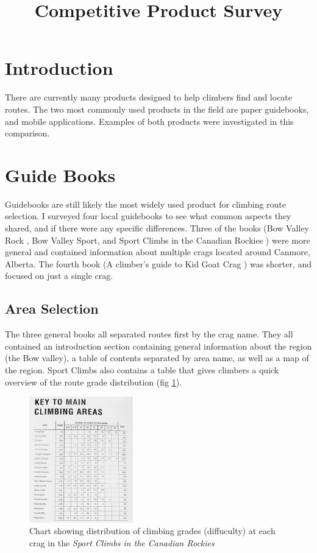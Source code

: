 \documentclass[10pt]{article}
\title{\color{cadet}Competitive Product Survey}
\author{}
\date{}
\begin{document}
\maketitle
\section{Introduction}
There are currently many products designed to help climbers find and locate routes. The two most commonly used products in the field are paper guidebooks, and mobile applications. Examples of both products were investigated in this comparison.

\section{Guide Books}
Guidebooks are still likely the most widely used product for climbing route selection. I surveyed four local guidebooks to see what common aspects they shared, and if there were any specific differences. Three of the books (Bow Valley Rock \cite{galloway}, Bow Valley Sport\cite{martin}, and Sport Climbs in the Canadian Rockies \cite{perry}) were more general and contained information about multiple crags located around Canmore, Alberta. The fourth book (A climber’s guide to Kid Goat Crag \cite{yonge}) was shorter, and focused on just a single crag.

\subsection{Area Selection}

The three general books all separated routes first by the crag name. They all contained an introduction section containing general information about the region (the Bow valley), a table of contents separated by area name, as well as a map of the region. Sport Climbs also contains a table that gives climbers a quick overview of the route grade distribution (fig \ref{fig:grade_distribution}).

\begin{figure}[h]
  \centering
  \includegraphics[width=0.4\textwidth]{key_climbing_areas.jpg}
  \caption{Chart showing distribution of climbing grades (diffuculty) at each crag in the \emph{Sport Climbs in the Canadian Rockies}}
  \label{fig:grade_distribution}
\end{figure}
\end{document}
